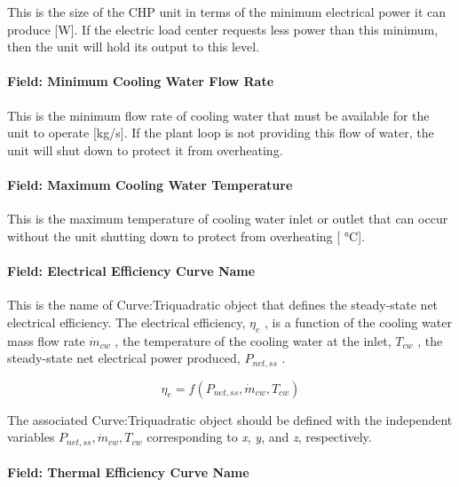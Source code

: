 This is the size of the CHP unit in terms of the minimum electrical power it can produce {[}W{]}. If the electric load center requests less power than this minimum, then the unit will hold its output to this level.

\paragraph{Field: Minimum Cooling Water Flow Rate}\label{field-minimum-cooling-water-flow-rate}

This is the minimum flow rate of cooling water that must be available for the unit to operate {[}kg/s{]}. If the plant loop is not providing this flow of water, the unit will shut down to protect it from overheating.

\paragraph{Field: Maximum Cooling Water Temperature}\label{field-maximum-cooling-water-temperature}

This is the maximum temperature of cooling water inlet or outlet that can occur without the unit shutting down to protect from overheating {[} °C{]}.

\paragraph{Field: Electrical Efficiency Curve Name}\label{field-electrical-efficiency-curve-name}

This is the name of Curve:Triquadratic object that defines the steady-state net electrical efficiency. The electrical efficiency, \(\eta_e\) , is a function of the cooling water mass flow rate \(\dot m_{cw}\) , the temperature of the cooling water at the inlet, \(T_{cw}\) , the steady-state net electrical power produced, \(P_{net,ss}\) .

\begin{equation}
\eta_e = f\left( {{P_{net,ss}},{{\dot m}_{cw}},{T_{cw}}} \right)
\end{equation}

The associated Curve:Triquadratic object should be defined with the independent variables \({P_{net,ss}},{\dot m_{cw}},{T_{cw}}\) corresponding to \emph{x}, \emph{y}, and \emph{z}, respectively.

\paragraph{Field: Thermal Efficiency Curve Name}\label{field-thermal-efficiency-curve-name}

